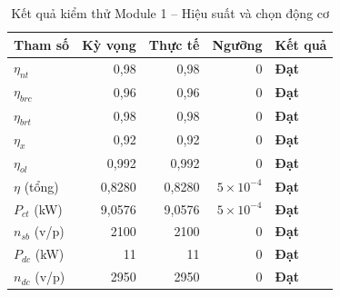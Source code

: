 \begin{table}[H]
  \centering
  \caption{Kết quả kiểm thử Module 1 -- Hiệu suất và chọn động cơ}
  \label{tab:test-m1-motor}
  \begin{tabular}{lrrrl}
    \toprule
    \textbf{Tham số} & \textbf{Kỳ vọng} & \textbf{Thực tế} & \textbf{Ngưỡng} & \textbf{Kết quả} \\
    \midrule
    $\eta_{nt}$ & 0,98 & 0,98 & 0 & \textbf{Đạt} \\
    $\eta_{brc}$ & 0,96 & 0,96 & 0 & \textbf{Đạt} \\
    $\eta_{brt}$ & 0,98 & 0,98 & 0 & \textbf{Đạt} \\
    $\eta_x$ & 0,92 & 0,92 & 0 & \textbf{Đạt} \\
    $\eta_{ol}$ & 0,992 & 0,992 & 0 & \textbf{Đạt} \\
    $\eta$ (tổng) & 0,8280 & 0,8280 & $5\times10^{-4}$ & \textbf{Đạt} \\
    $P_{ct}$ (kW) & 9,0576 & 9,0576 & $5\times10^{-4}$ & \textbf{Đạt} \\
    $n_{sb}$ (v/p) & 2100 & 2100 & 0 & \textbf{Đạt} \\
    $P_{dc}$ (kW) & 11 & 11 & 0 & \textbf{Đạt} \\
    $n_{dc}$ (v/p) & 2950 & 2950 & 0 & \textbf{Đạt} \\
    \bottomrule
  \end{tabular}
\end{table}

